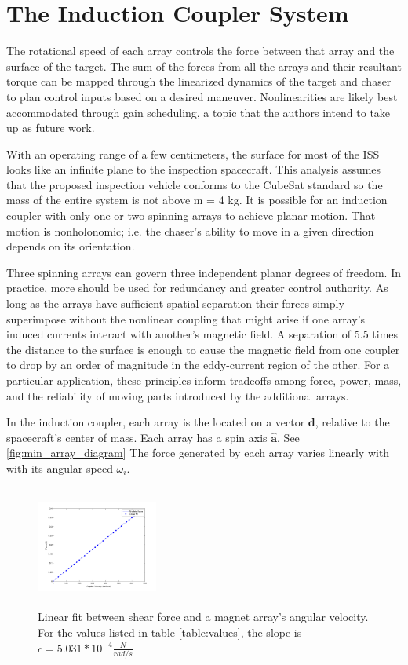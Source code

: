 \section{The Induction Coupler System}

The rotational speed of each array controls the force between that array and the surface of the target. The sum of the forces from all the arrays and their resultant torque can be mapped through the linearized dynamics of the target and chaser to plan control inputs based on a desired maneuver. Nonlinearities are likely best accommodated through gain scheduling, a topic that the authors intend to take up as future work.

With an operating range of a few centimeters, the surface for most of the ISS looks like an infinite plane to the inspection spacecraft. This analysis assumes that the proposed inspection vehicle conforms to the CubeSat standard so the mass of the entire system is not above m = 4 kg.
It is possible for an induction coupler with only one or two spinning arrays to achieve planar motion. That motion is nonholonomic; i.e. the chaser's ability to move in a given direction depends on its orientation.

Three spinning arrays can govern three independent planar degrees of freedom. In practice, more should be used for redundancy and greater control authority. As long as the arrays have sufficient spatial separation their forces simply superimpose without the nonlinear coupling that might arise if one array's induced currents interact with another's magnetic field. A separation of 5.5 times the distance to the surface is enough to cause the magnetic field from one coupler to drop by an order of magnitude in the eddy-current region of the other. For a particular application, these principles inform tradeoffs among force, power, mass, and the reliability of moving parts introduced by the additional arrays.

In the induction coupler, each array is the located on a vector $\boldsymbol{d}$, relative to the spacecraft's center of mass. Each array has a spin axis $\hat{\boldsymbol{a}}$. See \ref{fig:min_array_diagram} The force generated by each array varies linearly with with its angular speed $\omega_i$.

\begin{figure}
\label{fig:lin_fit}
\includegraphics[width = 4cm, height = 4cm ]{figures/lin_fit.png}
\caption{Linear fit between shear force and a magnet array's angular velocity. For the values listed in table \ref{table:values}, the slope is $c = 5.031 * 10^{-4} \frac{N}{rad/s}$}
\end{figure}


